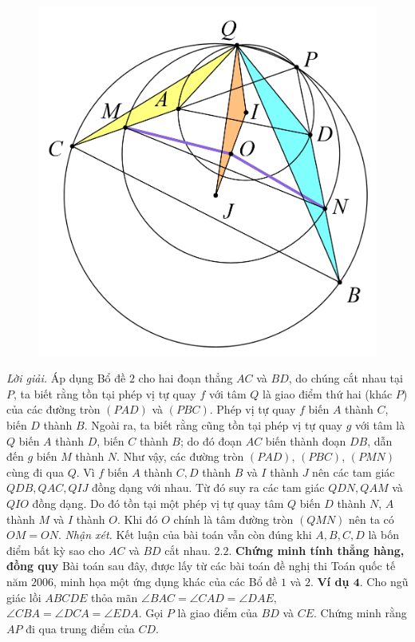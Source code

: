 \begin{multicols}{2}
\begin{figure}[H]
		\includegraphics[width= 0.9\linewidth]{7}
		\vspace*{-10pt}
	\end{figure}
	\textit{Lời giải.} Áp dụng Bổ đề $2$ cho hai đoạn thẳng $AC$ và $BD$, do chúng cắt nhau tại $P$, ta biết rằng tồn tại phép vị tự quay $f$ với tâm $Q$ là giao điểm thứ hai (khác $P$) của các đường tròn $(PAD)$ và $(PBC)$. Phép vị tự quay $f$ biến $A$ thành $C$, biến $D$ thành $B$. Ngoài ra, ta biết rằng cũng tồn tại phép vị tự quay $g$ với tâm là $Q$ biến $A$ thành $D$, biến $C$ thành $B$; do đó đoạn $AC$  biến thành đoạn $DB$, dẫn đến $g$ biến $M$ thành $N$. Như vậy, các đường tròn $(PAD)$, $(PBC)$, $(PMN)$ cùng đi qua $Q$. Vì $f$ biến $A$ thành $C,D$ thành $B$ và $I$ thành $J$ nên các tam giác $QDB,QAC,QIJ$ đồng dạng với nhau. Từ đó suy ra các tam giác $QDN,QAM$ và $QIO$ đồng dạng. Do đó tồn tại một phép vị tự quay tâm $Q$ biến $D$ thành $N$, $A$ thành $M$ và $I$ thành $O$. Khi đó $O$ chính là tâm đường tròn $(QMN)$ nên ta có $OM=ON$.
	\vskip 0.1cm
	\textit{Nhận xét.} Kết luận của bài toán vẫn còn đúng khi $A,B,C,D$ là bốn điểm bất kỳ sao cho $AC$ và $BD$ cắt nhau. 
	\vskip 0.1cm
	$\pmb{2.2.}$ \textbf{\color{diendantoanhoc}Chứng minh tính thẳng hàng, đồng quy}
	\vskip 0.1cm
	Bài toán sau đây, được lấy từ các bài toán đề nghị thi Toán quốc tế năm $2006$, minh họa một ứng dụng khác của các Bổ đề $1$ và $2$.
	\vskip 0.1cm
	\textbf{\color{diendantoanhoc}Ví dụ $\pmb{4.}$} Cho ngũ giác lồi $ABCDE$ thỏa mãn $\angle BAC = \angle CAD = \angle DAE,$ $\angle CBA = \angle DCA =\angle EDA$. Gọi $P$ là giao điểm của $BD$ và $CE$. Chứng minh rằng $AP$ đi qua trung điểm của $CD$. 

\end{multicols}
